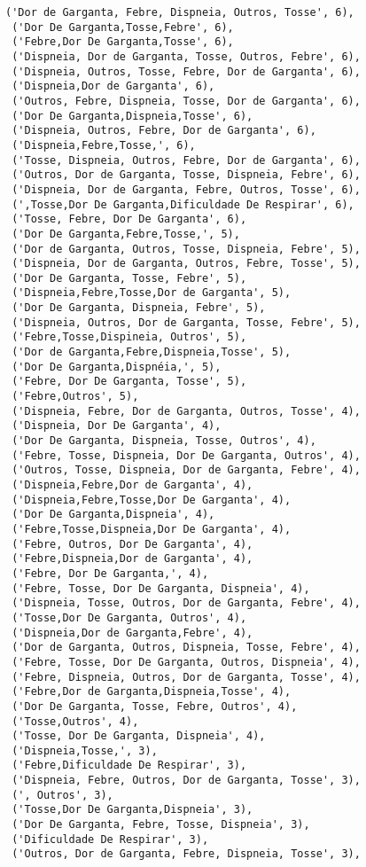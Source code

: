 \documentclass[11pt]{article}
\begin{document}
\begin{tcolorbox}[breakable, size=fbox, boxrule=.5pt, pad at break*=1mm, opacityfill=0]
\begin{Verbatim}[commandchars=\\\{\}]
 ('Dor de Garganta, Febre, Dispneia, Outros, Tosse', 6),
 ('Dor De Garganta,Tosse,Febre', 6),
 ('Febre,Dor De Garganta,Tosse', 6),
 ('Dispneia, Dor de Garganta, Tosse, Outros, Febre', 6),
 ('Dispneia, Outros, Tosse, Febre, Dor de Garganta', 6),
 ('Dispneia,Dor de Garganta', 6),
 ('Outros, Febre, Dispneia, Tosse, Dor de Garganta', 6),
 ('Dor De Garganta,Dispneia,Tosse', 6),
 ('Dispneia, Outros, Febre, Dor de Garganta', 6),
 ('Dispneia,Febre,Tosse,', 6),
 ('Tosse, Dispneia, Outros, Febre, Dor de Garganta', 6),
 ('Outros, Dor de Garganta, Tosse, Dispneia, Febre', 6),
 ('Dispneia, Dor de Garganta, Febre, Outros, Tosse', 6),
 (',Tosse,Dor De Garganta,Dificuldade De Respirar', 6),
 ('Tosse, Febre, Dor De Garganta', 6),
 ('Dor De Garganta,Febre,Tosse,', 5),
 ('Dor de Garganta, Outros, Tosse, Dispneia, Febre', 5),
 ('Dispneia, Dor de Garganta, Outros, Febre, Tosse', 5),
 ('Dor De Garganta, Tosse, Febre', 5),
 ('Dispneia,Febre,Tosse,Dor de Garganta', 5),
 ('Dor De Garganta, Dispneia, Febre', 5),
 ('Dispneia, Outros, Dor de Garganta, Tosse, Febre', 5),
 ('Febre,Tosse,Dispineia, Outros', 5),
 ('Dor de Garganta,Febre,Dispneia,Tosse', 5),
 ('Dor De Garganta,Dispnéia,', 5),
 ('Febre, Dor De Garganta, Tosse', 5),
 ('Febre,Outros', 5),
 ('Dispneia, Febre, Dor de Garganta, Outros, Tosse', 4),
 ('Dispneia, Dor De Garganta', 4),
 ('Dor De Garganta, Dispneia, Tosse, Outros', 4),
 ('Febre, Tosse, Dispneia, Dor De Garganta, Outros', 4),
 ('Outros, Tosse, Dispneia, Dor de Garganta, Febre', 4),
 ('Dispneia,Febre,Dor de Garganta', 4),
 ('Dispneia,Febre,Tosse,Dor De Garganta', 4),
 ('Dor De Garganta,Dispneia', 4),
 ('Febre,Tosse,Dispneia,Dor De Garganta', 4),
 ('Febre, Outros, Dor De Garganta', 4),
 ('Febre,Dispneia,Dor de Garganta', 4),
 ('Febre, Dor De Garganta,', 4),
 ('Febre, Tosse, Dor De Garganta, Dispneia', 4),
 ('Dispneia, Tosse, Outros, Dor de Garganta, Febre', 4),
 ('Tosse,Dor De Garganta, Outros', 4),
 ('Dispneia,Dor de Garganta,Febre', 4),
 ('Dor de Garganta, Outros, Dispneia, Tosse, Febre', 4),
 ('Febre, Tosse, Dor De Garganta, Outros, Dispneia', 4),
 ('Febre, Dispneia, Outros, Dor de Garganta, Tosse', 4),
 ('Febre,Dor de Garganta,Dispneia,Tosse', 4),
 ('Dor De Garganta, Tosse, Febre, Outros', 4),
 ('Tosse,Outros', 4),
 ('Tosse, Dor De Garganta, Dispneia', 4),
 ('Dispneia,Tosse,', 3),
 ('Febre,Dificuldade De Respirar', 3),
 ('Dispneia, Febre, Outros, Dor de Garganta, Tosse', 3),
 (', Outros', 3),
 ('Tosse,Dor De Garganta,Dispneia', 3),
 ('Dor De Garganta, Febre, Tosse, Dispneia', 3),
 ('Dificuldade De Respirar', 3),
 ('Outros, Dor de Garganta, Febre, Dispneia, Tosse', 3),

\end{Verbatim}
\end{tcolorbox}
\end{document}
